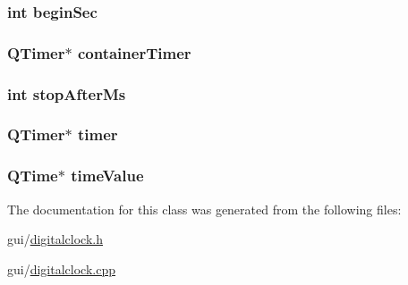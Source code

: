 \subsubsection[{\texorpdfstring{begin\+Sec}{beginSec}}]{\setlength{\rightskip}{0pt plus 5cm}int begin\+Sec\hspace{0.3cm}{\ttfamily [private]}}\hypertarget{classDigitalClock_aea23d1b4ccdcd8aa435aaab8d853af57}{}\label{classDigitalClock_aea23d1b4ccdcd8aa435aaab8d853af57}
\subsubsection[{\texorpdfstring{container\+Timer}{containerTimer}}]{\setlength{\rightskip}{0pt plus 5cm}Q\+Timer$\ast$ container\+Timer\hspace{0.3cm}{\ttfamily [private]}}\hypertarget{classDigitalClock_a3d92d64a319dca68e29374b3ec4262bf}{}\label{classDigitalClock_a3d92d64a319dca68e29374b3ec4262bf}
\subsubsection[{\texorpdfstring{stop\+After\+Ms}{stopAfterMs}}]{\setlength{\rightskip}{0pt plus 5cm}int stop\+After\+Ms\hspace{0.3cm}{\ttfamily [private]}}\hypertarget{classDigitalClock_adfb81207db5e40a4ccf2b3812632325f}{}\label{classDigitalClock_adfb81207db5e40a4ccf2b3812632325f}
\subsubsection[{\texorpdfstring{timer}{timer}}]{\setlength{\rightskip}{0pt plus 5cm}Q\+Timer$\ast$ timer\hspace{0.3cm}{\ttfamily [private]}}\hypertarget{classDigitalClock_ae0f3267ca73ca79b3a97682c8e0e7d2c}{}\label{classDigitalClock_ae0f3267ca73ca79b3a97682c8e0e7d2c}
\subsubsection[{\texorpdfstring{time\+Value}{timeValue}}]{\setlength{\rightskip}{0pt plus 5cm}Q\+Time$\ast$ time\+Value\hspace{0.3cm}{\ttfamily [private]}}\hypertarget{classDigitalClock_ad093050fd193ddb6080eee02766806b8}{}\label{classDigitalClock_ad093050fd193ddb6080eee02766806b8}


The documentation for this class was generated from the following files\+:\begin{DoxyCompactItemize}
\item 
gui/\hyperlink{digitalclock_8h}{digitalclock.\+h}\item 
gui/\hyperlink{digitalclock_8cpp}{digitalclock.\+cpp}\end{DoxyCompactItemize}
